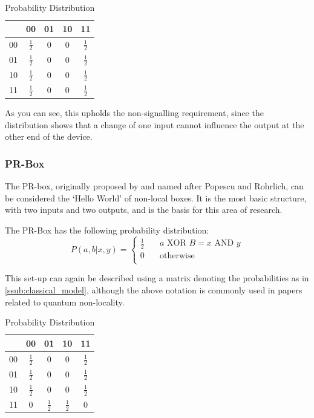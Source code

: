 \documentclass[report.tex]{subfiles}
\begin{document}
\begin{table}[H]
  \centering
  \begin{tabular}{l | c c c c}
      & 00 & 01 & 10 & 11 \\
      \hline
      00 & \(\frac{1}{2}\) & 0 & 0 & \(\frac{1}{2}\) \\
      01 & \(\frac{1}{2}\) & 0 & 0 & \(\frac{1}{2}\) \\
      10 & \(\frac{1}{2}\) & 0 & 0 & \(\frac{1}{2}\) \\
      11 & \(\frac{1}{2}\) & 0 & 0 & \(\frac{1}{2}\) \\
  \end{tabular}
  \caption{Probability Distribution}
  \label{tab:classical}
\end{table}

As you can see, this upholds the non-signalling requirement, since the
distribution shows that a change of one input cannot influence the output at the
other end of the device. 

\subsubsection{PR-Box} %
\label{ssub:pr_box}
The PR-box, originally proposed by and named after Popescu and Rohrlich, can be
considered the `Hello World' of non-local boxes. It is the most basic structure,
with two inputs and two outputs, and is the basis for this area of research.

The PR-Box has the following probability distribution:
\[
    P(a, b | x, y) = 
    \begin{cases}
        \frac{1}{2} & \quad a \text{ XOR } B = x \text{ AND } y \\
        0 & \quad \text{otherwise} \\
    \end{cases}
\]

This set-up can again be described using a matrix denoting the probabilities as
in \ref{ssub:classical_model}, although the above notation is commonly used in
papers related to quantum non-locality.

\begin{table}[H]
  \centering
\begin{tabular}{l | c c c c}
  & 00 & 01 & 10 & 11 \\
  \hline
  00 & \(\frac{1}{2}\) & 0 & 0 & \(\frac{1}{2}\) \\
  01 & \(\frac{1}{2}\) & 0 & 0 & \(\frac{1}{2}\) \\
  10 & \(\frac{1}{2}\) & 0 & 0 & \(\frac{1}{2}\) \\
  11 & 0 & \(\frac{1}{2}\) & \(\frac{1}{2}\) & 0 \\
\end{tabular}
  \caption{Probability Distribution}
  \label{tab:pr}
\end{table}
\end{document}
